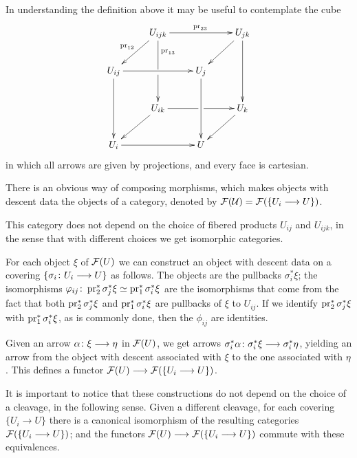 \begin{4   STACKS}
\begin{4.1 Descent of objects of fibcats}
\begin{definition}
\end{definition}

In understanding the definition above it may be useful to contemplate the cube 
   \begin{equation}\label{eq:basic-cube}
   \xymatrix{
   &U_{ijk}\ar[rr]^{\pr_{23}}\ar'[d]^{\pr_{13}}[dd]
   \ar[ld]_{\pr_{12}}
   &&U_{jk}\ar[ld]\ar[dd]\\
   U_{ij}\ar[rr]\ar[dd]
   && U_j \ar[dd]\\
   &U_{ik} \ar[ld]\ar'[r][rr]
   &&U_k\ar[ld]\\
   U_i \ar[rr]&& U
   }
   \end{equation}
in which all arrows are given by projections, and every face is cartesian.

There is an obvious way of composing morphisms, which makes objects with descent data the objects of a category, denoted by $\mathcal{F}(\mathcal{U}) = \mathcal{F}(\{U_i \longrightarrow U\})$.

\begin{remark}
This category does not depend on the choice of fibered products $U_{ij}$ and $U_{ijk}$, in the sense that with different choices we get isomorphic categories.
\end{remark}

For each object $\xi$ of $\mathcal{F}(U)$ we can construct an object with descent data on a covering $\{\sigma_i \colon U_i \arr U\}$ as follows. The objects are the pullbacks $\sigma_i^* \xi$; the isomorphisms  $\varphi_{ij} \colon \operatorname{pr}_2^* \sigma_j^* \xi \simeq \operatorname{pr}_1^* \sigma_i^* \xi$ are the isomorphisms that come from the fact that both $\operatorname{pr}_2^* \sigma_j^* \xi$ and $\operatorname{pr}_1^* \sigma_i^* \xi$ are pullbacks of $\xi$ to $U_{ij}$. If we identify $\operatorname{pr}_2^* \sigma_j^* \xi$ with $\operatorname{pr}_1^* \sigma_i^* \xi$, as is commonly done, then the $\phi_{ij}$ are identities.

Given an arrow $\alpha \colon \xi \arr \eta$ in $\mathcal{F}(U)$, we get arrows $\sigma_i^*\alpha \colon \sigma_i^* \xi \arr \sigma_i^* \eta$, yielding an arrow from the object with descent associated with $\xi$ to the one associated with $\eta$. This defines a functor $\cF(U) \arr \cF(\{U_i \to U\})$.

It is important to notice that these constructions do not depend on the choice of a cleavage, in the following sense. Given a different cleavage,  for each covering $\{U_i \to U\}$ there is a canonical isomorphism of the resulting categories $\mathcal{F}(\{U_i \longrightarrow U\})$; and the functors $\cF(U) \arr \cF(\{U_i \to U\})$ commute with these equivalences.




\end{4.1 Descent of objects of fibcats}
\end{4   STACKS}
